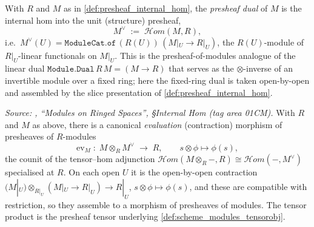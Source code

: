 \begin{definition}\leanok
  \label{def:presheaf_dual}
  With \(R\) and \(M\) as in \cref{def:presheaf_internal_hom}, the
  \emph{presheaf dual} of \(M\) is the internal hom into the unit (structure)
  presheaf,
  \[
    M^\vee \;:=\; \mathcal{H}om(M, R),
  \]
  i.e.\ \(M^\vee(U) = \mathtt{ModuleCat.of}\,(R(U))\,(M|_U \to R|_U)\), the
  \(R(U)\)-module of \(R|_U\)-linear functionals on \(M|_U\). This is the
  presheaf-of-modules analogue of the linear dual
  \(\mathtt{Module.Dual}\,R\,M = (M \to R)\) that serves as the \(\otimes\)-inverse of
  an invertible module over a fixed ring; here the fixed-ring dual is taken
  open-by-open and assembled by the slice presentation of
  \cref{def:presheaf_internal_hom}.
\end{definition}

\begin{lemma}\leanok
  \label{lem:internal_hom_eval}
  \textit{Source: \cite{stacks-project}, ``Modules on Ringed Spaces'', \S Internal Hom
  (tag area 01CM).}
  With \(R\) and \(M\) as above, there is a canonical \emph{evaluation} (contraction)
  morphism of presheaves of \(R\)-modules
  \[
    \mathrm{ev}_M \;\colon\; M \otimes_R M^\vee \;\longrightarrow\; R,
    \qquad s \otimes \phi \longmapsto \phi(s),
  \]
  the counit of the tensor--hom adjunction
  \(\mathcal{H}om(M \otimes_R -, R) \cong \mathcal{H}om(-, M^\vee)\) specialised at
  \(R\). On each open \(U\) it is the open-by-open contraction
  \((M|_U) \otimes_{R|_U} (M|_U \to R|_U) \to R|_U\), \(s \otimes \phi \mapsto
  \phi(s)\), and these are compatible with restriction, so they assemble to a morphism
  of presheaves of modules. The tensor product is the presheaf tensor underlying
  \cref{def:scheme_modules_tensorobj}.
\end{lemma}

